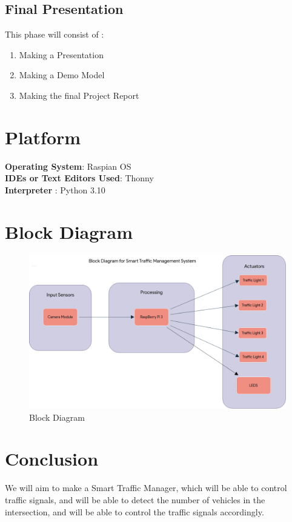 \documentclass[11pt]{article}
\begin{document}
\subsection{Final Presentation}
This phase will consist of :
\begin{enumerate}
	\item Making a Presentation
	\item Making a Demo Model
	\item Making the final Project Report
\end{enumerate}

\section{Platform}
\textbf{Operating System}: Raspian OS\\
\textbf{IDEs or Text Editors Used}: Thonny\\
\textbf{Interpreter} : Python 3.10\\

\section{Block Diagram}

\begin{figure}[H]
	\centering
	\includegraphics[width=.80\textwidth]{IOT Project Block Diagram.drawio.png}
	\caption{Block Diagram}
\end{figure}

\section{Conclusion}
We will aim to make a Smart Traffic Manager, which will be able to control traffic signals, and will be able to detect the number of vehicles in the intersection, and will be able to control the traffic signals accordingly.\\
\end{document}
